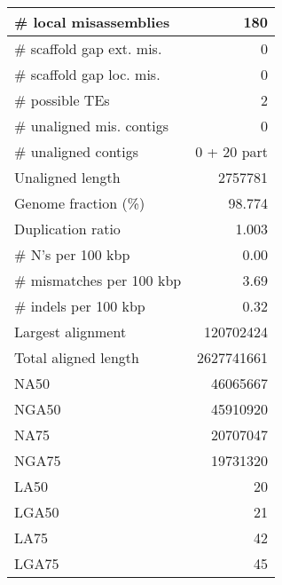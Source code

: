 \documentclass[12pt,a4paper]{article}
\begin{document}
\begin{table}[ht]
\begin{center}
\begin{tabular}{|l*{1}{|r}|}
\# local misassemblies & 180 \\ \hline
\# scaffold gap ext. mis. & 0 \\ \hline
\# scaffold gap loc. mis. & 0 \\ \hline
\# possible TEs & 2 \\ \hline
\# unaligned mis. contigs & 0 \\ \hline
\# unaligned contigs & 0 + 20 part \\ \hline
Unaligned length & 2757781 \\ \hline
Genome fraction (\%) & 98.774 \\ \hline
Duplication ratio & 1.003 \\ \hline
\# N's per 100 kbp & 0.00 \\ \hline
\# mismatches per 100 kbp & 3.69 \\ \hline
\# indels per 100 kbp & 0.32 \\ \hline
Largest alignment & 120702424 \\ \hline
Total aligned length & 2627741661 \\ \hline
NA50 & 46065667 \\ \hline
NGA50 & 45910920 \\ \hline
NA75 & 20707047 \\ \hline
NGA75 & 19731320 \\ \hline
LA50 & 20 \\ \hline
LGA50 & 21 \\ \hline
LA75 & 42 \\ \hline
LGA75 & 45 \\ \hline
\end{tabular}
\end{center}
\end{table}
\end{document}
